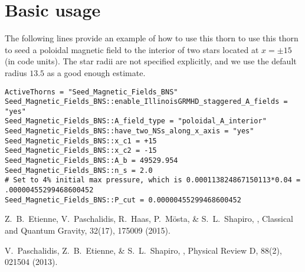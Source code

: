 \section{Basic usage}
\label{sec:basic_usage}

The following lines provide an example of how to use this thorn to use
this thorn to seed a poloidal magnetic field to the interior of two
stars located at $x=\pm15$ (in code units). The star radii are not
specified explicitly, and we use the default radius $13.5$ as a good
enough estimate.

\begin{verbatim}
ActiveThorns = "Seed_Magnetic_Fields_BNS"
Seed_Magnetic_Fields_BNS::enable_IllinoisGRMHD_staggered_A_fields = "yes"
Seed_Magnetic_Fields_BNS::A_field_type = "poloidal_A_interior"
Seed_Magnetic_Fields_BNS::have_two_NSs_along_x_axis = "yes"
Seed_Magnetic_Fields_BNS::x_c1 = +15
Seed_Magnetic_Fields_BNS::x_c2 = -15
Seed_Magnetic_Fields_BNS::A_b = 49529.954
Seed_Magnetic_Fields_BNS::n_s = 2.0
# Set to 4% initial max pressure, which is 0.000113824867150113*0.04 = .00000455299468600452
Seed_Magnetic_Fields_BNS::P_cut = 0.00000455299468600452
\end{verbatim}


\begin{thebibliography}{2}

  Z.~B.~Etienne, V.~Paschalidis, R.~Haas, P.~Mösta, \& S.~L.~Shapiro,
  ,
  Classical and Quantum Gravity, 32(17), 175009 (2015).

  V.~Paschalidis, Z.~B.~Etienne, \& S.~L.~Shapiro,
  ,
  Physical Review D, 88(2), 021504 (2013).

\end{thebibliography}



